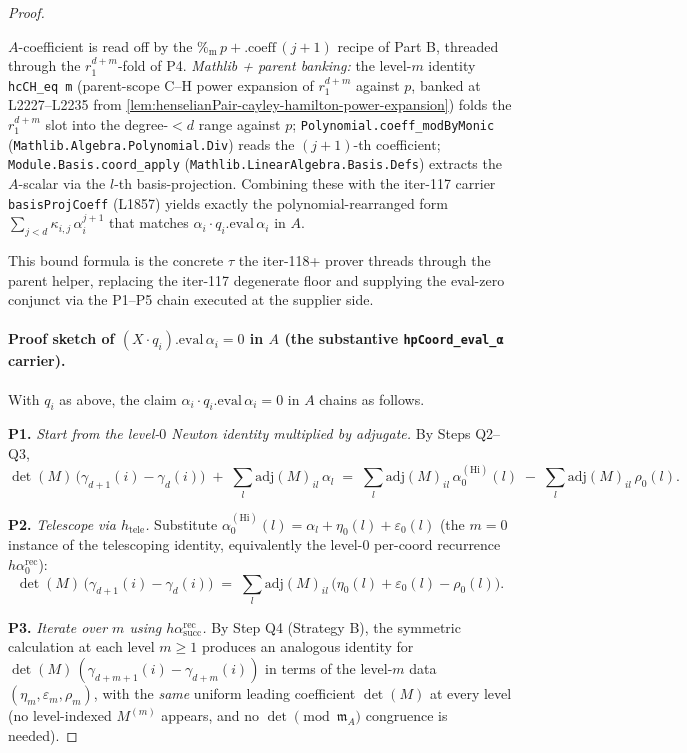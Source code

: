 \begin{proof}
\begin{itemize}
$A$-coefficient is read off by the
$\mathbin{\%_{\mathrm{m}}}\,p + .\mathrm{coeff}\,(j + 1)$ recipe
of Part B, threaded through the $r_1^{d + m}$-fold of P4.
\textit{Mathlib + parent banking:} the level-$m$ identity
\texttt{hcCH\_eq m} (parent-scope C--H power expansion of
$r_1^{d + m}$ against $p$, banked at L2227--L2235 from
\cref{lem:henselianPair-cayley-hamilton-power-expansion}) folds
the $r_1^{d + m}$ slot into the degree-$< d$ range against $p$;
\texttt{Polynomial.coeff\_modByMonic}
(\texttt{Mathlib.Algebra.Polynomial.Div}) reads the
$(j + 1)$-th coefficient; \texttt{Module.Basis.coord\_apply}
(\texttt{Mathlib.LinearAlgebra.Basis.Defs}) extracts the
$A$-scalar via the $l$-th basis-projection. Combining these with
the iter-117 carrier \texttt{basisProjCoeff} (L1857) yields
exactly the polynomial-rearranged form
$\sum_{j < d} \kappa_{i,j}\,\alpha_i^{j + 1}$ that matches
$\alpha_i \cdot q_i.\mathrm{eval}\,\alpha_i$ in $A$.
\end{itemize}
This bound formula is the concrete $\tau$ the iter-118+ prover
threads through the parent helper, replacing the iter-117
degenerate floor and supplying the eval-zero conjunct via the
P1--P5 chain executed at the supplier side.

\paragraph{Proof sketch of $(X \cdot q_i).\mathrm{eval}\,\alpha_i
= 0$ in $A$ (the substantive \texttt{hpCoord\_eval\_α} carrier).}
With $q_i$ as above, the claim $\alpha_i \cdot
q_i.\mathrm{eval}\,\alpha_i = 0$ in $A$ chains as follows.

\textbf{P1.} \emph{Start from the level-$0$ Newton identity
multiplied by adjugate.} By Steps Q2--Q3,
\[
\det(M)\,\bigl(\gamma_{d+1}(i) - \gamma_d(i)\bigr)
\;+\;
\sum_l \mathrm{adj}(M)_{il}\,\alpha_l
\;=\;
\sum_l \mathrm{adj}(M)_{il}\,\alpha^{(\mathrm{Hi})}_0(l)
\;-\; \sum_l \mathrm{adj}(M)_{il}\,\rho_0(l).
\]

\textbf{P2.} \emph{Telescope via $h_{\mathrm{tele}}$.} Substitute
$\alpha^{(\mathrm{Hi})}_0(l) = \alpha_l + \eta_0(l) +
\varepsilon_0(l)$ (the $m = 0$ instance of the telescoping
identity, equivalently the level-$0$ per-coord recurrence
$h\alpha_0^{\mathrm{rec}}$):
\[
\det(M)\,\bigl(\gamma_{d+1}(i) - \gamma_d(i)\bigr)
\;=\;
\sum_l \mathrm{adj}(M)_{il}\,\bigl(\eta_0(l) + \varepsilon_0(l)
- \rho_0(l)\bigr).
\]

\textbf{P3.} \emph{Iterate over $m$ using $h\alpha_{\mathrm{succ}}^{\mathrm{rec}}$.}
By Step Q4 (Strategy B), the symmetric calculation at each level
$m \ge 1$ produces an analogous identity for
$\det(M)\,(\gamma_{d+m+1}(i) - \gamma_{d+m}(i))$ in terms of the
level-$m$ data $(\eta_m, \varepsilon_m, \rho_m)$, with the
\emph{same} uniform leading coefficient $\det(M)$ at every level
(no level-indexed $M^{(m)}$ appears, and no
$\det \pmod{\mathfrak m_A}$ congruence is needed).


\end{proof}
